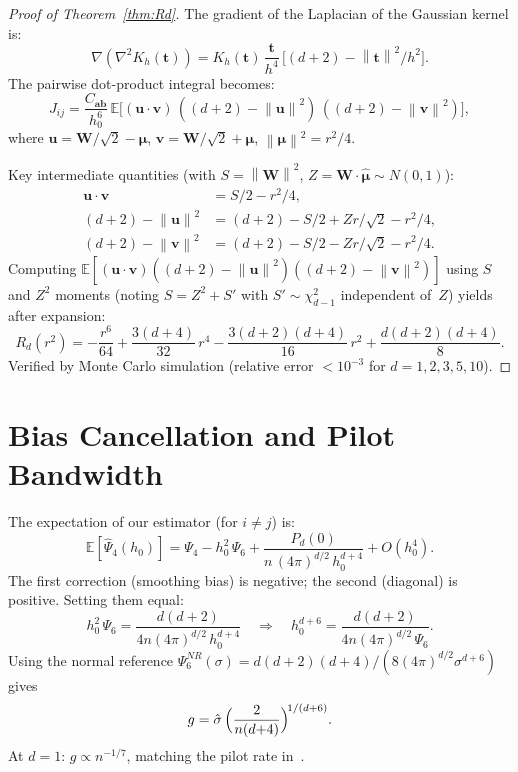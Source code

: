 \documentclass[12pt]{article}
\newcommand{\E}{\mathbb{E}}
\newcommand{\bW}{\bm{W}}
\newcommand{\norm}[1]{\left\| #1 \right\|}
\begin{document}
\begin{proof}[Proof of Theorem~\ref{thm:Rd}]
The gradient of the Laplacian of the Gaussian kernel is:
\[
\nabla(\nabla^2 K_h(\bm{t})) = K_h(\bm{t})\,\frac{\bm{t}}{h^4}\,\bigl[(d{+}2) - \norm{\bm{t}}^2/h^2\bigr].
\]
The pairwise dot-product integral becomes:
\[
J_{ij} = \frac{C_{\bm{ab}}}{h_0^6}\,\E\bigl[(\bm{u}\!\cdot\!\bm{v})\,((d{+}2){-}\norm{\bm{u}}^2)\,((d{+}2){-}\norm{\bm{v}}^2)\bigr],
\]
where $\bm{u} = \bW/\sqrt2 - \bm\mu$, $\bm{v} = \bW/\sqrt2 + \bm\mu$, $\norm{\bm\mu}^2 = r^2/4$.

Key intermediate quantities (with $S = \norm{\bW}^2$, $Z = \bW\!\cdot\!\hat{\bm\mu} \sim N(0,1)$):
\begin{align*}
\bm{u}\!\cdot\!\bm{v} &= S/2 - r^2/4,\\
(d{+}2) - \norm{\bm{u}}^2 &= (d{+}2) - S/2 + Zr/\sqrt2 - r^2/4,\\
(d{+}2) - \norm{\bm{v}}^2 &= (d{+}2) - S/2 - Zr/\sqrt2 - r^2/4.
\end{align*}
Computing $\E[(\bm{u}\!\cdot\!\bm{v})((d{+}2){-}\norm{\bm{u}}^2)((d{+}2){-}\norm{\bm{v}}^2)]$ using $S$ and $Z^2$ moments (noting $S = Z^2 + S'$ with $S' \sim \chi^2_{d-1}$ independent of~$Z$) yields after expansion:
\[
R_d(r^2) = -\frac{r^6}{64} + \frac{3(d{+}4)}{32}\,r^4 - \frac{3(d{+}2)(d{+}4)}{16}\,r^2 + \frac{d(d{+}2)(d{+}4)}{8}.
\]
Verified by Monte Carlo simulation (relative error $<10^{-3}$ for $d = 1,2,3,5,10$).
\end{proof}

\section{Bias Cancellation and Pilot Bandwidth}
\label{sec:supp_pilot}

The expectation of our estimator (for $i \neq j$) is:
\[
\E[\hat\Psi_4(h_0)] = \Psi_4 - h_0^2\,\Psi_6 + \frac{P_d(0)}{n\,(4\pi)^{d/2}\,h_0^{d+4}} + O(h_0^4).
\]
The first correction (smoothing bias) is negative; the second (diagonal) is positive. Setting them equal:
\[
h_0^2\,\Psi_6 = \frac{d(d{+}2)}{4n(4\pi)^{d/2}\,h_0^{d+4}}
\quad\Rightarrow\quad
h_0^{d+6} = \frac{d(d{+}2)}{4n(4\pi)^{d/2}\,\Psi_6}.
\]
Using the normal reference $\Psi_6^{NR}(\sigma) = d(d{+}2)(d{+}4)/(8(4\pi)^{d/2}\sigma^{d+6})$ gives
\[
g = \hat\sigma\,\Bigl(\frac{2}{n(d{+}4)}\Bigr)^{\!1/(d+6)}.
\]
At $d{=}1$: $g \propto n^{-1/7}$, matching the pilot rate in~\citet{sheather1991}.

\end{document}
